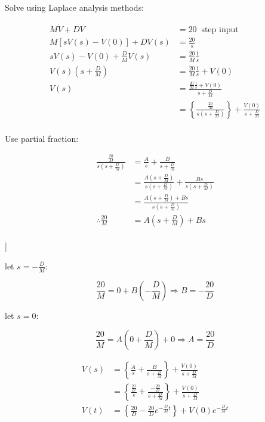 \documentclass[
]{book}
\begin{document}
Solve using Laplace analysis methods:

\begin{align}
M\dot{V} + DV &= 20 \;\;\text{step input} \\
M\left[ sV(s) - V(0) \right] + D V(s) &= \frac{20}{s} \\
sV(s) - V(0) + \frac{D}{M} V(s) &= \frac{20}{M} \frac{1}{s} \\
V(s) \left(s + \frac{D}{M} \right) &= \frac{20}{M} \frac{1}{s} + V(0) \\
V(s) &= \frac{ \frac{20}{M} \frac{1}{s} + V(0) }{s + \frac{D}{M} } \\
&= \left\{
          \frac{
                \frac{20}{M}
                }
                {s \left(
                          s + \frac{D}{M}
                        \right)
                } 
  \right\} + \frac{V(0)}{s + \frac{D}{M}} \\
\end{align}

Use partial fraction:

\begin{align}
\frac{ \frac{20}{M} }{s \left( s + \frac{D}{M} \right) } &= \frac{A}{s} + \frac{B}{s + \frac{D}{M}}\\
&= \frac{A \left( s + \frac{D}{M} \right)}{s \left( s + \frac{D}{M} \right) } + \frac{B s}{s \left( s + \frac{D}{M} \right) }\\
&= \frac{A \left( s + \frac{D}{M} \right) + B s}{s \left( s + \frac{D}{M} \right) }\\
\therefore \frac{20}{M} &= A \left( s + \frac{D}{M} \right) + B s
\end{align}\\
{]}

let \(s = -\frac{D}{M}\):

\[\frac{20}{M} = 0 + B \left(-\frac{D}{M}\right) \Rightarrow B = -\frac{20}{D} \]

let \(s = 0\):

\[\frac{20}{M} = A \left( 0 + \frac{D}{M} \right) + 0 \Rightarrow A = \frac{20}{D} \]

\begin{align}
V(s) &= \left\{ \frac{A}{s} + \frac{B}{s + \frac{D}{M}} \right\} + \frac{V(0)}{s + \frac{D}{M}} \\
&= \left\{ \frac{\frac{20}{D}}{s} + \frac{-\frac{20}{D}}{s + \frac{D}{M}} \right\} + \frac{V(0)}{s + \frac{D}{M}} \\
V(t) &= \left\{ \frac{20}{D} -\frac{20}{D}e^{-\frac{D}{M}t} \right\} + V(0)e^{-\frac{D}{M}t} \\
\end{align}
\end{document}
